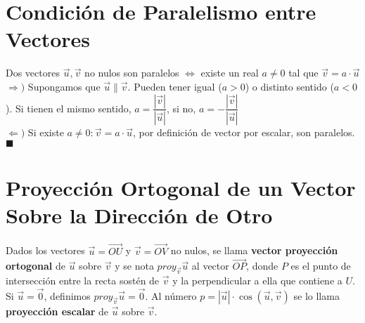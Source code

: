 \documentclass[11pt,a4paper]{article}
\newcommand*{\QEDA}{\null\nobreak\hfill\ensuremath{\blacksquare}}
\begin{document}
\section{Condici\'on de Paralelismo entre Vectores}
\noindent Dos vectores $\overrightarrow{u},\overrightarrow{v}$ no nulos son paralelos $\iff$ existe un real $a\not=0$ tal que $\overrightarrow{v} = a \cdot\overrightarrow{u}$\\
$\Rightarrow)$ Supongamos que $\overrightarrow{u} \parallel \overrightarrow{v}$. Pueden tener igual ($a>0$) o distinto sentido ($a<0$). Si tienen el mismo sentido, $a=\dfrac{|\overrightarrow{v}|}{|\overrightarrow{u}|}$, si no, $a=-\dfrac{|\overrightarrow{v}|}{|\overrightarrow{u}|}$\\
$\Leftarrow)$ Si existe $a\not=0 : \overrightarrow{v} = a\cdot\overrightarrow{u}$, por definici\'on de vector por escalar, son paralelos. \QEDA

\section{Proyecci\'on Ortogonal de un Vector Sobre la Direcci\'on de Otro}
\noindent Dados los vectores $\overrightarrow{u} = \overrightarrow{OU}$ y $\overrightarrow{v} = \overrightarrow{OV}$ no nulos, se llama \textbf{vector proyecci\'on ortogonal} de $\overrightarrow{u}$ sobre $\overrightarrow{v}$ y se nota $proy_{\overrightarrow{v}}\overrightarrow{u}$ al vector $\overrightarrow{OP}$, donde $P$ es el punto de intersecci\'on entre la recta sost\'en de $\overrightarrow{v}$ y la perpendicular a ella que contiene a $U$. Si $\overrightarrow{u} = \overrightarrow{0}$, definimos $proy_{\overrightarrow{v}}\overrightarrow{u} = \overrightarrow{0}$. Al n\'umero $p=|\overrightarrow{u}|\cdot\cos (\overrightarrow{u},\overrightarrow{v})$ se lo llama \textbf{proyecci\'on escalar} de $\overrightarrow{u}$ sobre $\overrightarrow{v}$.
\end{document}
